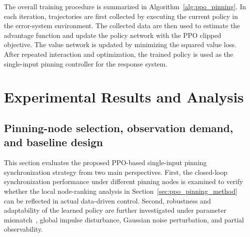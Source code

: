 \documentclass[10pt,twocolumn]{article}
\theoremstyle{definition}
\begin{document}
The overall training procedure is summarized in Algorithm~\ref{alg:ppo_pinning}. In each iteration, trajectories are first collected by executing the current policy in the error-system environment. The collected data are then used to estimate the advantage function and update the policy network with the PPO clipped objective. The value network is updated by minimizing the squared value loss. After repeated interaction and optimization, the trained policy is used as the single-input pinning controller for the response system.


\section{Experimental Results and Analysis}
\label{sec:experiments}
\subsection{Pinning-node selection, observation demand, and baseline design}

This section evaluates the proposed PPO-based single-input pinning synchronization strategy from two main perspectives. First, the closed-loop synchronization performance under different pinning nodes is examined to verify whether the local node-ranking analysis in Section~\ref{sec:ppo_pinning_method} can be reflected in actual data-driven control. Second, robustness and adaptability of the learned policy are further investigated under parameter mismatch~\cite{kobiolka2025reducedorder}, global impulse disturbance, Gaussian noise perturbation, and partial observability.

\end{document}
